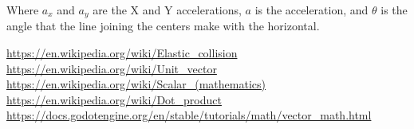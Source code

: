 \documentclass{amsart}
\begin{document}
Where \(a_x\) and \(a_y\) are the X and Y accelerations, \(a\) is the
acceleration, and \(\theta\) is the angle that the line joining the centers make
with the horizontal.

\newpage

\begin{thebibliography}{9}
  \url{https://en.wikipedia.org/wiki/Elastic_collision}
  \url{https://en.wikipedia.org/wiki/Unit_vector}
  \url{https://en.wikipedia.org/wiki/Scalar_(mathematics)}
  \url{https://en.wikipedia.org/wiki/Dot_product}
  \url{https://docs.godotengine.org/en/stable/tutorials/math/vector_math.html}
\end{thebibliography}
\end{document}
